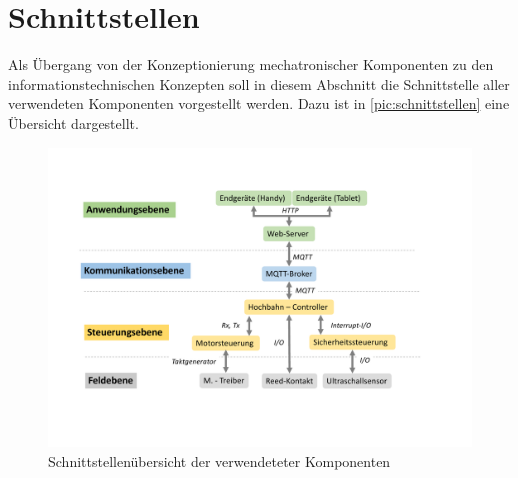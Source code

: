 \section{Schnittstellen}
\label{sec:konzeptSchnittstellen}
Als Übergang von der Konzeptionierung mechatronischer Komponenten zu den informationstechnischen Konzepten soll in diesem Abschnitt die Schnittstelle aller verwendeten Komponenten vorgestellt werden. Dazu ist in \autoref{pic:schnittstellen} eine Übersicht dargestellt.

\begin{figure}[h]
	\centering
	\includegraphics[width=16cm]{schnittstellen.pdf}
	\caption{Schnittstellenübersicht der verwendeteter Komponenten}
	\label{pic:schnittstellen}
\end{figure}

